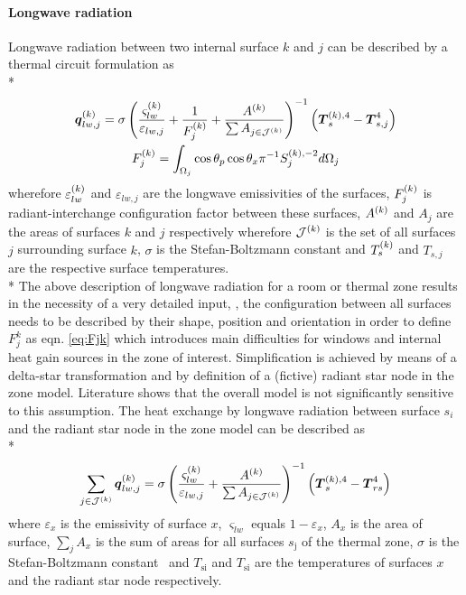 \paragraph{Longwave radiation}
Longwave radiation between two internal surface $k$ and $j$ can be described by a thermal circuit formulation as\citep{Buchberg1954,Buchberg1955,Oppenheim1956} \\*
\begin{gather}
\boldsymbol{q}_{lw,j}^{(k)}= \sigma \left(\frac{\varsigma_{lw}^{(k)}}{\varepsilon_{lw,j}} + \frac{1}{F_{j}^{(k)}} + \frac{A^{(k)}}{\sum A_{j \in \mathcal{J}^{(k)}}}\right)^{-1} \left(\boldsymbol{T}_{s}^{(k),4}-\boldsymbol{T}_{s,j}^{4}\right) \\
F_{j}^{(k)} = \int_{\Omega_{j}} \cos \theta_{p} \cos \theta_{x} \pi^{-1} S_{j}^{(k),-2} d\Omega_{j}
\label{eq:Fjk}
\end{gather}
wherefore $\varepsilon_{lw}^{(k)}$ and $\varepsilon_{lw,j}$ are the longwave emissivities of the surfaces, $F_{j}^{(k)}$ is radiant-interchange configuration factor between these surfaces, $A^{(k)}$ and $A_{j}$ are the areas of surfaces $k$ and $j$ respectively wherefore $\mathcal{J}^{(k)}$ is the set of all surfaces $j$ surrounding surface $k$, $\sigma$ is the Stefan-Boltzmann constant and $T_{s}^{(k)}$ and $T_{s,j}$ are the respective surface temperatures.\citep{Stefan1879,Boltzmann1884,Hamilton1952,Mohr2008} \\*
The above description of longwave radiation for a room or thermal zone results in the necessity of a very detailed input, \ie, the configuration between all surfaces needs to be described by their shape, position and orientation in order to define $F_{j}^{k}$ as eqn. \ref{eq:Fjk} which introduces main difficulties for windows and internal heat gain sources in the zone of interest. Simplification is achieved by means of a delta-star transformation and by definition of a (fictive) radiant star node in the zone model.\citep{Kenelly1899} Literature shows that the overall model is not significantly sensitive to this assumption.\citep{Liesen1997} The heat exchange by longwave radiation between surface $s_{i}$ and the radiant star node in the zone model can be described as \\*
\begin{equation}
\sum_{j \in \mathcal{J}^{(k)}} \boldsymbol{q}_{lw,j}^{(k)}= \sigma \left(\frac{\varsigma_{lw}^{(k)}}{\varepsilon_{lw,j}} + \frac{A^{(k)}}{\sum A_{j \in \mathcal{J}^{(k)}}}\right)^{-1} \left(\boldsymbol{T}_{s}^{(k),4}-\boldsymbol{T}_{rs}^{4}\right)
\end{equation}
where $\varepsilon_{x}$ is the emissivity of surface $x$, $\varsigma_{lw}$ equals $1-\varepsilon_{x}$, $A_{x}$ is the area of surface, $\sum_{j}A_{x}$ is the sum of areas for all surfaces $s_{\textrm{j}}$ of the thermal zone, $\sigma$ is the Stefan-Boltzmann constant~\cite{Mohr2008} and $T_{\textrm{si}}$ and $T_{\textrm{si}}$ are the temperatures of surfaces $x$ and the radiant star node  respectively. 

